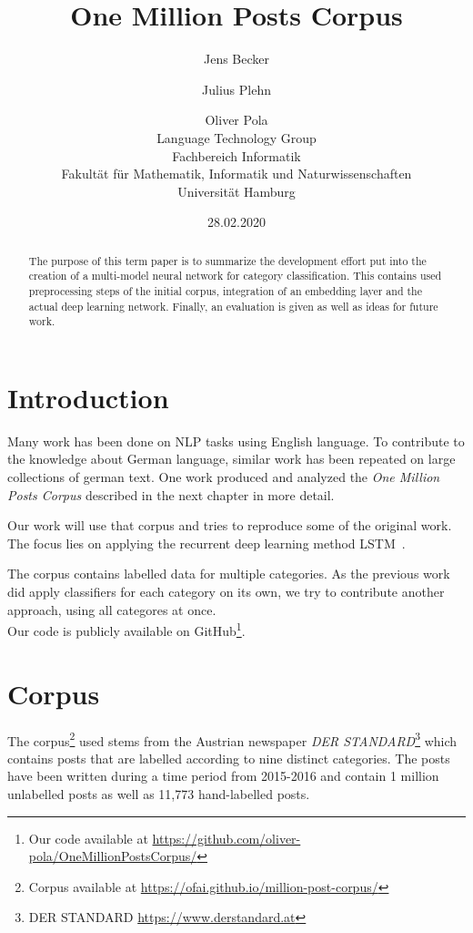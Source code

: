 \documentclass[11pt,a4paper]{article}
\title{One Million Posts Corpus}
\author{Jens Becker \and Julius Plehn \and Oliver Pola \\ 
	Language Technology Group \\
	Fachbereich Informatik \\
	Fakultät für Mathematik, Informatik und Naturwissenschaften \\
	Universität Hamburg
}
\date{28.02.2020}
\begin{document}
\maketitle
\begin{abstract}
The purpose of this term paper is to summarize the development effort put into the creation of a multi-model neural network for category classification. This contains used preprocessing steps of the initial corpus, integration of an embedding layer and the actual deep learning network. Finally, an evaluation is given as well as ideas for future work. 

 
\end{abstract}

\section{Introduction}

Many work has been done on NLP tasks using English language.
To contribute to the knowledge about German language, similar work has been repeated on large collections of german text.
One work produced and analyzed the \textit{One Million Posts Corpus} described in the next chapter in more detail.~\cite{Schabus17, Schabus18}

Our work will use that corpus and tries to reproduce some of the original work.
The focus lies on applying the recurrent deep learning method LSTM~\cite{lstm}.

The corpus contains labelled data for multiple categories.
As the previous work did apply classifiers for each category on its own, we try to contribute another approach, using all categores at once.\\

Our code is publicly available on GitHub\footnote{Our code available at \url{https://github.com/oliver-pola/OneMillionPostsCorpus/}}.

\section{Corpus}
The corpus\footnote{Corpus available at \url{https://ofai.github.io/million-post-corpus/}} used stems from the Austrian newspaper \textit{DER STANDARD}\footnote{DER STANDARD \url{https://www.derstandard.at}} which contains posts that are labelled according to nine distinct categories. The posts have been written during a time period from 2015-2016 and contain 1 million unlabelled posts as well as 11,773 hand-labelled posts.
\end{document}
